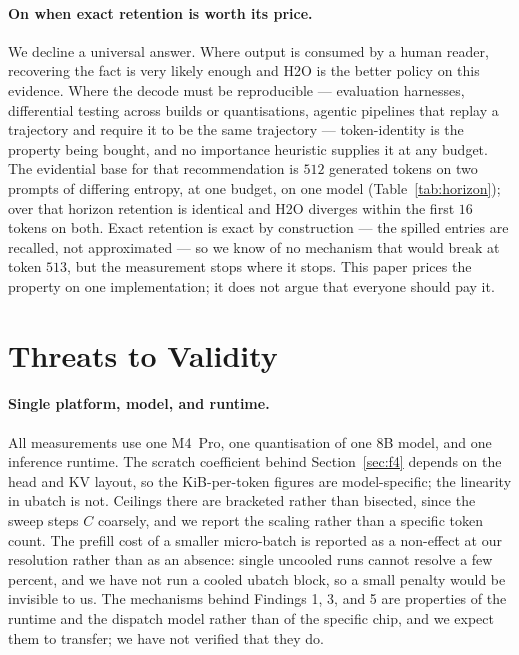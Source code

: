 \documentclass[manuscript,anonymous,review]{acmart}
\begin{document}
\paragraph{On when exact retention is worth its price.} We decline a
universal answer. Where output is consumed by a human reader,
recovering the fact is very likely enough and H2O is the better policy
on this evidence. Where the decode must be reproducible --- evaluation
harnesses, differential testing across builds or quantisations, agentic
pipelines that replay a trajectory and require it to be the same
trajectory --- token-identity is the property being bought, and no
importance heuristic supplies it at any budget. The evidential base for
that recommendation is $512$ generated tokens on two prompts of
differing entropy, at one budget, on one model
(Table~\ref{tab:horizon}); over that horizon retention is identical and
H2O diverges within the first $16$ tokens on both. Exact retention is
exact by construction --- the spilled entries are recalled, not
approximated --- so we know of no mechanism that would break at token
$513$, but the measurement stops where it stops. This paper prices the
property on one implementation; it does not argue that everyone should
pay it.

\section{Threats to Validity}
\label{sec:threats}

\paragraph{Single platform, model, and runtime.} All measurements use
one M4~Pro, one quantisation of one 8B model, and one inference
runtime. The scratch coefficient behind Section~\ref{sec:f4} depends on
the head and KV layout, so the KiB-per-token figures are
model-specific; the linearity in ubatch is not. Ceilings there are
bracketed rather than bisected, since the sweep steps $C$ coarsely, and
we report the scaling rather than a specific token count. The prefill
cost of a smaller micro-batch is reported as a non-effect at our
resolution rather than as an absence: single uncooled runs cannot
resolve a few percent, and we have not run a cooled ubatch block,
so a small penalty would be invisible to us. The
mechanisms behind Findings 1, 3, and 5 are properties of the runtime
and the dispatch model rather than of the specific chip, and we expect
them to transfer; we have not verified that they do.
\end{document}
